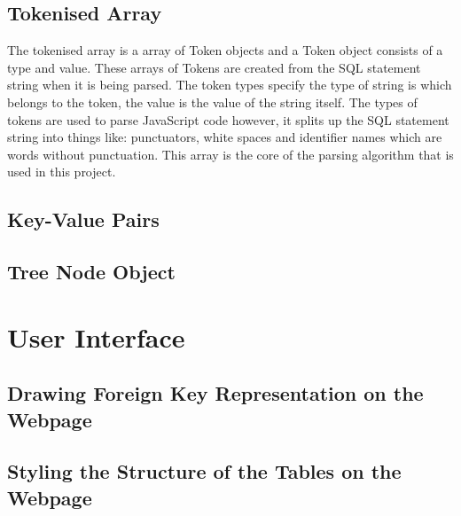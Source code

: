 \subsection{Tokenised Array}

The tokenised array is a array of Token objects and a Token object consists of a type and value. These arrays of Tokens are created from the SQL statement string when it is being parsed. The token types specify the type of string is which belongs to the token, the value is the value of the string itself. The types of tokens are used to parse JavaScript code however, it splits up the SQL statement string into things like: punctuators, white spaces and identifier names which are words without punctuation. This array is the core of the parsing algorithm that is used in this project.

\subsection{Key-Value Pairs}



\subsection{Tree Node Object}



\section{User Interface}



\subsection{Drawing Foreign Key Representation on the Webpage}



\subsection{Styling the Structure of the Tables on the Webpage}











